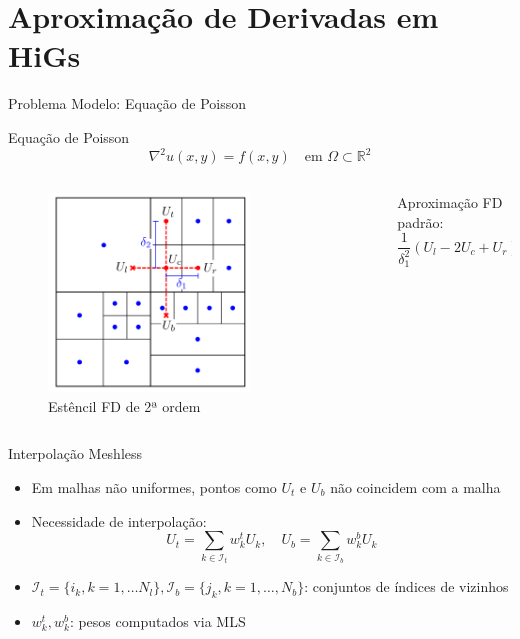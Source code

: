\documentclass[../main/main.tex]{subfiles}
\begin{document}
\section{Aproximação de Derivadas em HiGs}

\begin{frame}{Problema Modelo: Equação de Poisson}
\begin{block}{Equação de Poisson}
\[
\nabla^2 u(x, y) = f(x, y) \quad \text{em } \Omega \subset \mathbb{R}^2
\]
\end{block}

\vspace{0.5cm}
\begin{columns}[T]
\begin{column}{0.4\textwidth}
\begin{figure}
\centering
\includegraphics[width=0.7\textwidth]{imgs/figura2.png}
\caption{Estêncil FD de 2ª ordem}
\end{figure}
\end{column}

\begin{column}{0.6\textwidth}

Aproximação FD padrão:
\[
\frac{1}{\delta_1^2}(U_l - 2U_c + U_r) + \frac{1}{\delta_2^2}(U_t - 2U_c + U_b) = f_c
\]
\end{column}
\end{columns}
\end{frame}

\begin{frame}{Interpolação Meshless}
\begin{itemize}
\item Em malhas não uniformes, pontos como $U_t$ e $U_b$ não coincidem com a malha
\item Necessidade de interpolação:
\[
U_t = \sum_{k \in \mathcal{I}_t} w_k^t U_k, \quad U_b = \sum_{k \in \mathcal{I}_b} w_k^b U_k
\]
\item $\mathcal{I}_t = \{i_k, k = 1, \ldots N_l\}, \mathcal{I}_b = \{j_k, k = 1, \ldots, N_b\}$: conjuntos de índices de vizinhos
\item $w_k^t, w_k^b$: pesos computados via MLS
\end{itemize}
\end{frame}
\end{document}
